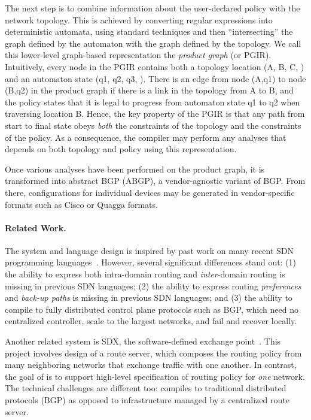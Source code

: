 The next step is to combine information about
the user-declared policy with the network topology.
This is achieved by converting regular expressions into deterministic
automata, using standard techniques and then ``intersecting'' the graph
defined by the automaton with the graph defined by the topology.
We call this lower-level graph-based representation the \emph{product graph} (or PGIR).
Intuitively, every node in the PGIR contains both a topology location
(A, B, C, \etc) and an automaton state (q1, q2, q3, \etc).  There is an
edge from node (A,q1) to node (B,q2) in the product graph if there is
a link in the topology from A to B, and the \Propane policy states that
it is legal to progress from automaton state q1 to q2 when traversing
location B.  Hence,
the key property of the PGIR is that any path from start to final state
obeys \emph{both} the constraints of the topology and the constraints
of the policy.  As a consequence, the compiler may perform any
analyses that depends on both topology and policy using this representation.  

Once various analyses have been performed on the product graph, it is
transformed into abstract BGP (ABGP), a vendor-agnostic variant of BGP.
From there, configurations for individual devices may be generated in
vendor-specific formats such as Cisco or Quagga formats.

\paragraph*{Related Work.}
The \Propane system and language design is inspired by past work on many 
recent SDN programming
languages~\cite{frenetic,pyretic,flowlog,foster:merlin,netkat,kinetic,pga}.
However, several significant differences stand out:  (1) the ability to express
both intra-domain routing and \emph{inter}-domain routing is missing in
previous SDN languages;
(2) the ability to express routing \emph{preferences} and 
\emph{back-up paths} is missing in
previous SDN languages;
and (3) the ability to compile to fully distributed control plane
protocols such as BGP, which need no centralized controller,
scale to the largest networks, and fail and recover locally.

Another related system is SDX, the software-defined exchange 
point~\cite{sdx,isdx}. This project involves design of a route server, which 
composes the routing policy from
many neighboring networks that exchange traffic
with one another.
In contrast, the goal of \Propane is to support high-level 
specification of routing policy for \emph{one}
network.  The technical challenges are different too:
\Propane compiles to traditional distributed protocols (BGP) as opposed
to infrastructure managed by a centralized route server.

